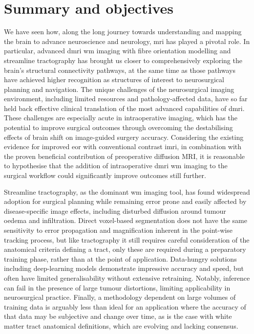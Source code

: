 \section{Summary and objectives}
\label{sec:problem}

We have seen how, along the long journey towards understanding and mapping the brain to advance neuroscience and neurology, \gls{mri} has played a pivotal role.
In particular, advanced \gls{dmri} \gls{wm} imaging with fibre orientation modelling and streamline tractography has brought us closer to comprehensively exploring the brain's structural connectivity pathways, at the same time as those pathways have achieved higher recognition as structures of interest to neurosurgical planning and navigation.
The unique challenges of the neurosurgical imaging environment, including limited resources and pathology-affected data, have so far held back effective clinical translation of the most advanced capabilities of \gls{dmri}.
These challenges are especially acute in intraoperative imaging, which has the potential to improve surgical outcomes through overcoming the destabilising effects of brain shift on image-guided surgery accuracy.
Considering the existing evidence for improved \gls{eor} with conventional contrast \gls{imri}, in combination with the proven beneficial contribution of preoperative diffusion MRI, it is reasonable to hypothesise that the addition of intraoperative \gls{dmri} \gls{wm} imaging to the surgical workflow could significantly improve outcomes still further\autocite{Manan2022}.

Streamline tractography, as the dominant \gls{wm} imaging tool, has found widespread adoption for surgical planning while remaining error prone and easily affected by disease-specific image effects, including disturbed diffusion around tumour oedema and infiltration.
Direct voxel-based segmentation does not have the same sensitivity to error propagation and magnification inherent in the point-wise tracking process, but like tractography it still requires careful consideration of the anatomical criteria defining a tract, only these are required during a preparatory training phase, rather than at the point of application.
Data-hungry solutions including deep-learning models demonstrate impressive accuracy and speed, but often have limited generalisability without extensive retraining.
Notably, inference can fail in the presence of large tumour distortions, limiting applicability in neurosurgical practice.
Finally, a methodology dependent on large volumes of training data is arguably less than ideal for an application where the accuracy of that data may be subjective and change over time, as is the case with white matter tract anatomical definitions, which are evolving and lacking consensus.

